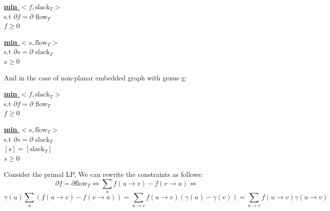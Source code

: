 \documentclass{article}
\begin{document}
\begin{minipage}[t]{0.48\linewidth}
\begin{center}
\begin{algorithm}
\textbf{\underline{min $<f, \text{slack}_{T}>$}} \\
  s.t  $\partial f =\partial $  flow$_T$ \\ \qquad
       $f \geq 0$
\end{algorithm}
\end{center}
\end{minipage}
\hfill
\begin{minipage}[t]{0.48\linewidth}
\begin{algorithm}
\textbf{\underline{min $<s, \text{flow}_{T}>$}} \\
  s.t  $\partial s = \partial $ slack$_T$ \\ \qquad
       $s \geq 0$
\end{algorithm}
\end{minipage}

\vspace{0.3 cm}
And in the case of non-planar embedded graph with genus g:
\vspace{0.1 cm}

\begin{minipage}[t]{0.48\linewidth}
\begin{center}
\begin{algorithm}
\textbf{\underline{min $<f, \text{slack}_{T}>$}} \\
  s.t  $\partial f =\partial $  flow$_T$ \\ \qquad
       $f \geq 0$
\end{algorithm}
\end{center}
\end{minipage}
\hfill
\begin{minipage}[t]{0.48\linewidth}
\begin{algorithm}
\textbf{\underline{min $<s, \text{flow}_{T}>$}} \\
  s.t  $\partial s = \partial $ slack$_T$ \\ \qquad
       $[s] = [\text{slack}_T]$ \\ \qquad
       $s \geq 0$
\end{algorithm}
\end{minipage}
\vspace{0.3 cm}

Consider the primal LP, We can rewrite the constraints as follows:
\[ \partial f = \partial \text{flow}_T \Longleftrightarrow \sum 
  \limits_u f(u \rightarrow v) - f(v \rightarrow u) \Longleftrightarrow \]
\[ \gamma (u)\sum_u (f(u \rightarrow v) - f(v \rightarrow u)) = 
  \sum \limits_{u \rightarrow v} f(u \rightarrow v) (\gamma (u) - \gamma (v)) = 
  \sum \limits_{u \rightarrow v} f(u \rightarrow v) \gamma (u \rightarrow v)\]
\end{document}
